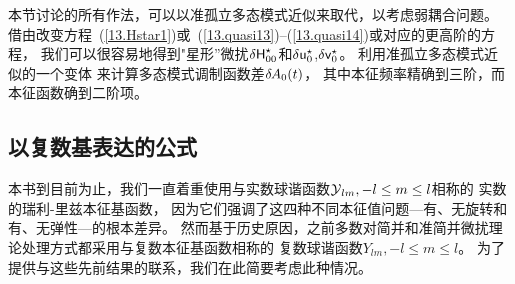 {{{{%

本节讨论的所有作法，可以以准孤立多态模式近似来取代，以考虑弱耦合问题。
借由改变方程~(\ref{13.Hstar1})或~(\ref{13.quasi13})--(\ref{13.quasi14})或对应的更高阶的方程，
我们可以很容易地得到"星形”微扰$\mbox{$\sf \delta$}\mbox{${\sf H}$}_{00}^{\star}$和$\mbox{$\sf \delta$}\mbox{${\sf u}$}_0^{\star}$,$\mbox{$\sf \delta$}\mbox{${\sf v}$}_0^{\star}$。
\textcite{clevede&lognonne96}利用准孤立多态模式近似的一个变体
来计算多态模式调制函数差$\delta\hspace{-0.3 mm}A_0(t)$，
其中本征频率精确到三阶，而本征函数确到二阶项。
%

\renewcommand{\thesubsection}{$\!\!\!\raise1.3ex\hbox{$\star$}\!\!$
\arabic{chapter}.\arabic{section}.\arabic{subsection}}
\subsection{以复数基表达的公式}
%
%
\renewcommand{\thesubsection}{\arabic{chapter}.\arabic{section}.\arabic{subsection}}

本书到目前为止，我们一直着重使用与实数球谐函数$\mbox{$\cal Y$}_{lm},-l\leq m\leq l$相称的
实数的瑞利-里兹本征基函数，
因为它们强调了这四种不同本征值问题---有、无旋转和有、无弹性---的根本差异。
然而基于历史原因，之前多数对简并和准简并微扰理论处理方式都采用与复数本征基函数相称的 复数球谐函数$Y_{lm},-l\leq m\leq l$。
%
%
为了提供与这些先前结果的联系，我们在此简要考虑此种情况。

}}}}
